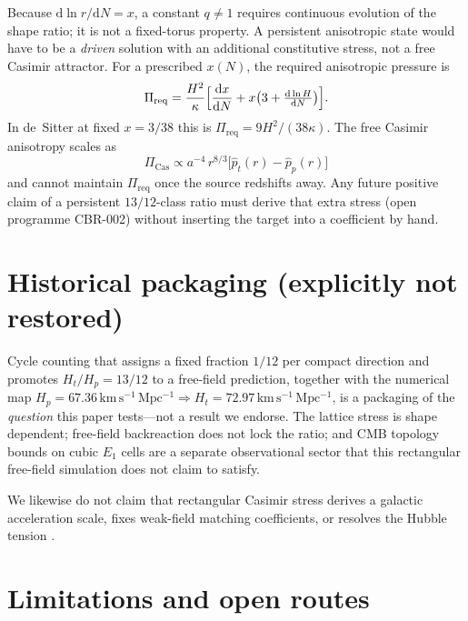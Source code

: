 \documentclass[aps,prd,reprint,superscriptaddress,nofootinbib,floatfix]{revtex4-2}
\newcommand{\Ht}{H_{t}}
\newcommand{\Hp}{H_{p}}
\begin{document}
Because \(\mathrm{d}\ln r/\mathrm{d}N=x\), a constant \(q\neq 1\) requires
continuous evolution of the shape ratio; it is not a fixed-torus property.
A persistent anisotropic state would have to be a \emph{driven} solution with
an additional constitutive stress, not a free Casimir attractor.
For a prescribed \(x(N)\), the required anisotropic pressure is
\begin{equation}
 \Pi_{\mathrm{req}}=\frac{H^2}{\kappa}
 \Bigl[\frac{\mathrm{d}x}{\mathrm{d}N}
 +x\bigl(3+\tfrac{\mathrm{d}\ln H}{\mathrm{d}N}\bigr)\Bigr].
\end{equation}
In de~Sitter at fixed \(x=3/38\) this is \(\Pi_{\mathrm{req}}=9H^2/(38\kappa)\).
The free Casimir anisotropy scales as
\begin{equation}
 \Pi_{\mathrm{Cas}}\propto a^{-4}\,r^{8/3}
 \bigl[\widehat p_t(r)-\widehat p_p(r)\bigr]
\end{equation}
and cannot maintain \(\Pi_{\mathrm{req}}\) once the source redshifts away.
Any future positive claim of a persistent \(13/12\)-class ratio must derive
that extra stress (open programme CBR-002) without inserting the target into a
coefficient by hand.

\section{Historical packaging (explicitly not restored)}
\label{sec:history}

Cycle counting that assigns a fixed fraction \(1/12\) per compact direction and
promotes \(\Ht/\Hp=13/12\) to a free-field prediction, together with the
numerical map \(H_p=67.36\,\mathrm{km\,s^{-1}\,Mpc^{-1}}\Rightarrow
H_t=72.97\,\mathrm{km\,s^{-1}\,Mpc^{-1}}\), is a packaging of the \emph{question}
this paper tests---not a result we endorse.
The lattice stress is shape dependent; free-field backreaction does not lock
the ratio; and CMB topology bounds on cubic \(E_1\) cells
\cite{planck_topology,compact_promise} are a separate observational sector that
this rectangular free-field simulation does not claim to satisfy.

We likewise do not claim that rectangular Casimir stress derives a galactic
acceleration scale, fixes weak-field matching coefficients, or resolves the
Hubble tension \cite{planck,riess2022}.

\section{Limitations and open routes}
\label{sec:limits}
\end{document}
